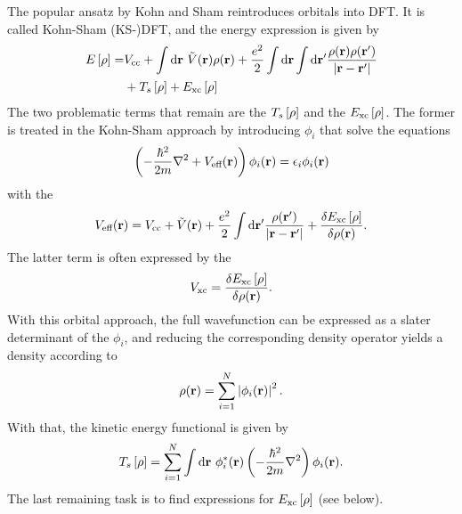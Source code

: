 \documentclass[8.5pt,twoside,twocolumn]{article}
\newcommand\di{\te{d}}
\renewcommand\r{\bo r}
\newcommand\indr{\enmat{\int\di \r}}
\theoremstyle{standard}
\begin{document}
The popular ansatz by Kohn and Sham \cite{KohnSham1965} reintroduces orbitals
into DFT. It is called Kohn-Sham (KS-)DFT, and the energy expression is given by
\newcommand\er{\ed{\rho}}
\newcommand\exc{E_{\te{xc}}}
\begin{equation}
\begin{aligned}
 E\ed{\rho}=&\vcc+\indr\ \tilde V(\r) \rho(\r) + \frac {e^2}{2}\indr\indr' \frac {\rho(\r)\rho(\r')}{\abs{\r-\r'}}\\
 &+T_s 	\ed{\rho}+\exc\ed{\rho}
\end{aligned}
\label{Theo:EnergyDensityFunctional}
\end{equation}
The two problematic terms that remain are the  $T_s\er$ and the
 $\exc\er$. The former is treated in the Kohn-Sham approach
by  introducing  $\phi_i$ that solve the equations
\newcommand\veff{V_{\te{eff}}}
\newcommand\hm{\frac{\hbar^2}{2m}}
\begin{equation}
\rb{-\frac{\hbar^2}{2m} \nabla^2 + \veff(\r)} \phi_i(\r) = \eps_i \phi_i(\r)
\label{Theo:SCFDFT}
\end{equation}
with the 
\begin{equation}
\veff(\r)=\vcc+ \tilde V(\r) + \frac {e^2}2 \indr'
\frac{\rho(\r')}{\abs{\r-\r'}}+\delti{\exc\er}{\rho(\r)}.
\label{Theo:Veff}
\end{equation}
The latter term is often expressed by the 
\newcommand\vxc{V_{\te{xc}}}
\begin{equation}
\vxc=\delti{\exc\er}{\rho(\r)}.
\label{Theo:Vxc}
\end{equation}
With this orbital approach, the full wavefunction can be expressed as a slater determinant of 
the $\phi_i$, and reducing the corresponding density operator yields a density according to
\begin{equation}
\rho(\r)=\sum_{i=1}^N \abs{\phi_i(\r)}^2.
\label{Theo:RhoByPhi}
\end{equation}
With that, the kinetic energy functional is given by
\begin{equation}
T_s\er=\sum_{i=1}^N \indr\ \phi_i^*(\r) \rb{-\hm \nabla^2} \phi_i(\r).
\end{equation}
The last remaining task is to find expressions for $\exc\er$ (see below).
\end{document}
